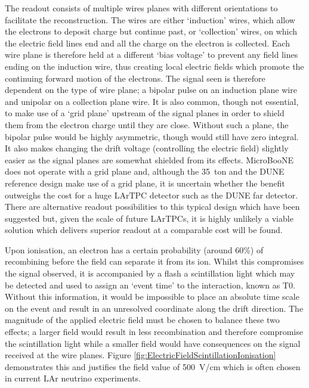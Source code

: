 The readout consists of multiple wires planes with different orientations to facilitate the reconstruction.  The wires are either `induction' wires, which allow the electrons to deposit charge but continue past, or `collection' wires, on which the electric field lines end and all the charge on the electron is collected.  Each wire plane is therefore held at a different `bias voltage' to prevent any field lines ending on the induction wire, thus creating local electric fields which promote the continuing forward motion of the electrons.  The signal seen is therefore dependent on the type of wire plane; a bipolar pulse on an induction plane wire and unipolar on a collection plane wire.  It is also common, though not essential, to make use of a `grid plane' upstream of the signal planes in order to shield them from the electron charge until they are close.  Without such a plane, the bipolar pulse would be highly asymmetric, though would still have zero integral.  It also makes changing the drift voltage (controlling the electric field) slightly easier as the signal planes are somewhat shielded from its effects.  MicroBooNE does not operate with a grid plane and, although the 35~ton and the DUNE reference design make use of a grid plane, it is uncertain whether the benefit outweighs the cost for a huge LArTPC detector such as the DUNE far detector.  There are alternative readout possibilities to this typical design which have been suggested but, given the scale of future LArTPCs, it is highly unlikely a viable solution which delivers superior readout at a comparable cost will be found.

Upon ionisation, an electron has a certain probability (around 60\%) of recombining before the field can separate it from its ion.  Whilst this compromises the signal observed, it is accompanied by a flash a scintillation light which may be detected and used to assign an `event time' to the interaction, known as T0.  Without this information, it would be impossible to place an absolute time scale on the event and result in an unresolved coordinate along the drift direction.  The magnitude of the applied electric field must be chosen to balance these two effects; a larger field would result in less recombination and therefore compromise the scintillation light while a smaller field would have consequences on the signal received at the wire planes.  Figure \ref{fig:ElectricFieldScintillationIonisation} demonstrates this and justifies the field value of 500~V/cm which is often chosen in current LAr neutrino experiments.

